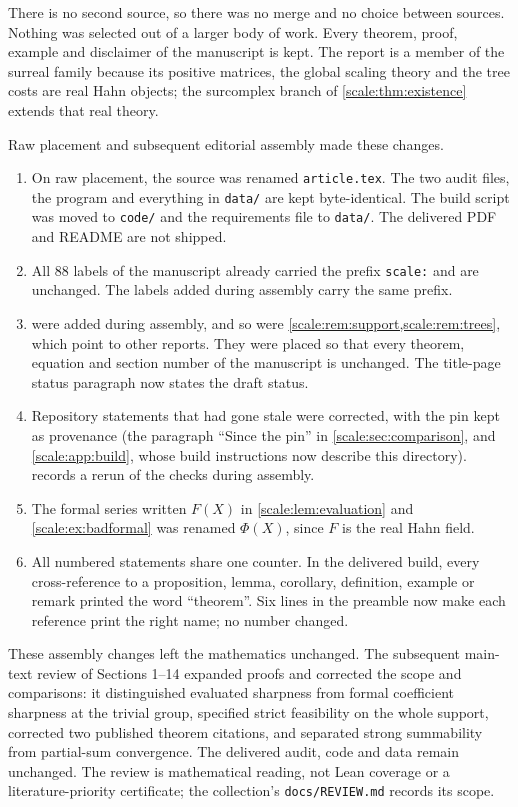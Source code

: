 \documentclass[11pt,a4paper]{article}
\numberwithin{equation}{section}
\theoremstyle{definition}
\begin{document}
There is no second source, so there was no merge and no choice between
sources. Nothing was selected out of a larger body of work. Every theorem,
proof, example and disclaimer of the manuscript is kept. The report is a
member of the surreal family because its positive matrices, the global
scaling theory and the tree costs are real Hahn objects; the surcomplex
branch of \cref{scale:thm:existence} extends that real theory.

Raw placement and subsequent editorial assembly made these changes.
\begin{enumerate}[label=(\alph*)]
\item On raw placement, the source was renamed \texttt{article.tex}. The two audit files, the
program and everything in \texttt{data/} are kept byte-identical. The build
script was moved to \texttt{code/} and the requirements file to
\texttt{data/}. The delivered PDF and README are not shipped.
\item All 88 labels of the manuscript already carried the prefix
\texttt{scale:} and are unchanged. The labels added during assembly carry
the same prefix.
\item {}
were added during assembly, and so were \cref{scale:rem:support,scale:rem:trees}, which
point to other reports. They were placed so that every theorem, equation
and section number of the manuscript is unchanged. The title-page status
paragraph now states the draft status.
\item Repository statements that had gone stale were corrected, with the pin
kept as provenance (the paragraph ``Since the pin'' in
\cref{scale:sec:comparison}, and \cref{scale:app:build}, whose build
instructions now describe this directory). 
records a rerun of the checks during assembly.
\item The formal series written $F(X)$ in \cref{scale:lem:evaluation} and
\cref{scale:ex:badformal} was renamed $\Phi(X)$, since $F$ is the real Hahn
field.
\item All numbered statements share one counter. In the delivered build,
every cross-reference to a proposition, lemma, corollary, definition,
example or remark printed the word ``theorem''. Six lines in the preamble now make each
reference print the right name; no number changed.
\end{enumerate}
These assembly changes left the mathematics unchanged. The subsequent
main-text review of Sections 1--14 expanded proofs and corrected the scope
and comparisons: it distinguished evaluated sharpness from formal
coefficient sharpness at the trivial group, specified strict feasibility
on the whole support, corrected two published theorem citations, and
separated strong summability from partial-sum convergence. The delivered
audit, code and data remain unchanged. The review is mathematical reading,
not Lean coverage or a literature-priority certificate; the collection's
\nolinkurl{docs/REVIEW.md} records its scope.
\end{document}
